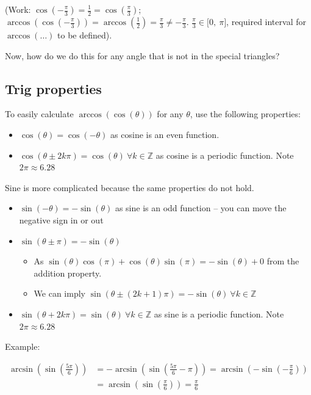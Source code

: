 \documentclass[12pt]{article}
\theoremstyle{plain}
\theoremstyle{remark}
\theoremstyle{definition}
\begin{document}
(Work:
\(\cos\left( - \frac{\pi}{3} \right) = \frac{1}{2} = \cos\left( \frac{\pi}{3} \right)\);
\(\arccos\left( \cos\left( - \frac{\pi}{3} \right) \right) = \arccos\left( \frac{1}{2} \right) = \frac{\pi}{3} \neq - \frac{\pi}{3}\).
\(\frac{\pi}{3} \in \lbrack 0,\ \pi\rbrack\), required interval for
\(\arccos(\ldots)\) to be defined).

Now, how do we do this for any angle that is not in the special
triangles?


\subsection{Trig properties}

To easily calculate \(\arccos\left( \cos(\theta) \right)\) for any
\(\theta\), use the following properties:

\begin{itemize}
\item
  \(\cos(\theta) = \cos( - \theta)\) as cosine is an even function.
\item
  \(\cos(\theta \pm 2k\pi) = \cos(\theta)\ \forall k\mathbb{\in Z}\) as
  cosine is a periodic function. Note \(2\pi \approx 6.28\)
\end{itemize}

Sine is more complicated because the same properties do not hold.

\begin{itemize}
\item
  \(\sin( - \theta) = - \sin(\theta)\) as sine is an odd function -- you
  can move the negative sign in or out
\item
  \(\sin(\theta \pm \pi) = - \sin(\theta)\)

  \begin{itemize}
  \item
    As
    \(\sin(\theta)\cos(\pi) + \cos(\theta)\sin(\pi) = - \sin(\theta) + 0\)
    from the addition property.
  \item
    We can imply
    \(\sin\left( \theta \pm (2k + 1)\pi \right) = - \sin(\theta)\ \forall k\mathbb{\in Z}\)
  \end{itemize}
\item
  \(\sin(\theta + 2k\pi) = \sin(\theta)\ \forall k\mathbb{\in Z}\) as
  sine is a periodic function. Note \(2\pi \approx 6.28\)
\end{itemize}

Example:

\begin{align*}
\arcsin\left( \sin\left( \frac{5\pi}{6} \right) \right) &= - \arcsin\left( \sin\left( \frac{5\pi}{6} - \pi \right) \right) = \arcsin\left( - \sin\left( - \frac{\pi}{6} \right) \right) \\
&= \arcsin\left( \sin\left( \frac{\pi}{6} \right) \right) = \frac{\pi}{6}
\end{align*}
\end{document}
